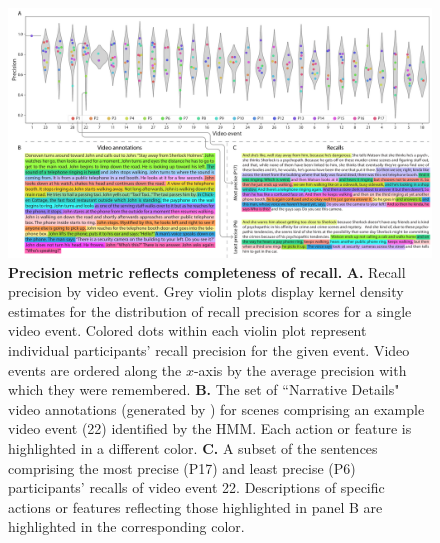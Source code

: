 \documentclass{article}
\begin{document}
\begin{figure}[t]
  \centering
  \includegraphics[width=1\textwidth]{figs/precision_detail}
  \caption{\small \textbf{Precision metric reflects completeness of recall.} \textbf{A.} Recall precision by video event.  Grey violin plots display kernel density estimates for the distribution of recall precision scores for a single video event.  Colored dots within each violin plot represent individual participants' recall precision for the given event.  Video events are ordered along the $x$-axis by the average precision with which they were remembered.  \textbf{B.} The set of ``Narrative Details" video annotations (generated by \citealp{ChenEtal17}) for scenes comprising an example video event (22) identified by the HMM.  Each action or feature is highlighted in a different color.  \textbf{C.} A subset of the sentences comprising the most precise (P17) and least precise (P6) participants' recalls of video event 22.  Descriptions of specific actions or features reflecting those highlighted in panel B are highlighted in the corresponding color.}
  \label{fig:precision-detail}
\end{figure}
\end{document}
